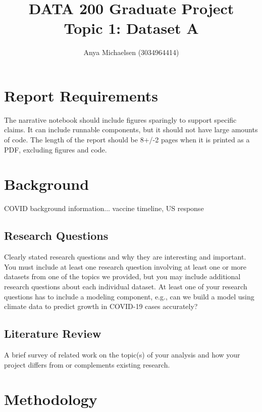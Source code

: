 \documentclass[11pt]{article}
\title{DATA 200 Graduate Project\\ Topic 1: Dataset A}
\author{ Anya Michaelsen (3034964414) }
\date{}
\begin{document}
\maketitle	

 \tableofcontents


\section{Report Requirements}



The narrative notebook should include figures sparingly to support specific claims. It can include runnable components, but it should not have large amounts of code. The length of the report should be 8+/-2 pages when it is printed as a PDF, excluding figures and code.



\pagebreak
\section{Background}
COVID background information... vaccine timeline, US response 


\subsection{Research Questions}
Clearly stated research questions and why they are interesting and important. You must include at least one research question involving at least one or more datasets from one of the topics we provided, but you may include additional research questions about each individual dataset. At least one of your research questions has to include a modeling component, e.g., can we build a model using climate data to predict growth in COVID-19 cases accurately?

\subsection{Literature Review}
A brief survey of related work on the topic(s) of your analysis and how your project differs from or complements existing research.

\section{Methodology}
\end{document}
